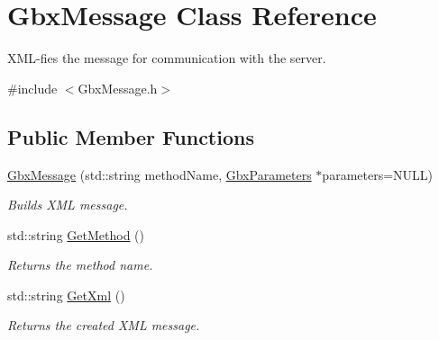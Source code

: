 \hypertarget{classGbxMessage}{\section{Gbx\-Message Class Reference}
\label{classGbxMessage}
}


X\-M\-L-\/fies the message for communication with the server.  




{\ttfamily \#include $<$Gbx\-Message.\-h$>$}

\subsection*{Public Member Functions}
\begin{DoxyCompactItemize}
\item 
\hyperlink{classGbxMessage_aa06aa73544aa343e42a5f19434a05928}{Gbx\-Message} (std\-::string method\-Name, \hyperlink{classGbxParameters}{Gbx\-Parameters} $\ast$parameters=N\-U\-L\-L)
\begin{DoxyCompactList}\small\item\em Builds X\-M\-L message. \end{DoxyCompactList}\item 
\hypertarget{classGbxMessage_a53e00a162c293251bef476ad74d0134c}{std\-::string \hyperlink{classGbxMessage_a53e00a162c293251bef476ad74d0134c}{Get\-Method} ()}\label{classGbxMessage_a53e00a162c293251bef476ad74d0134c}

\begin{DoxyCompactList}\small\item\em Returns the method name. \end{DoxyCompactList}\item 
\hypertarget{classGbxMessage_ac81e16efce7da483a696d6653e18c9d8}{std\-::string \hyperlink{classGbxMessage_ac81e16efce7da483a696d6653e18c9d8}{Get\-Xml} ()}\label{classGbxMessage_ac81e16efce7da483a696d6653e18c9d8}

\begin{DoxyCompactList}\small\item\em Returns the created X\-M\-L message. \end{DoxyCompactList}\end{DoxyCompactItemize}

